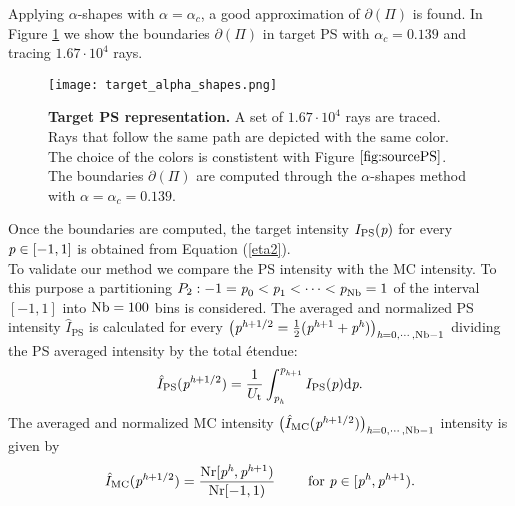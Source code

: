 Applying $\alpha$-shapes with $\alpha=\alpha_c$, a good approximation of $\partial$$(\Pi)$ is found. In Figure \ref{fig:targetPS} we show the boundaries 
$\partial$$(\Pi)$ in target PS  with $\alpha_c=0.139$ and tracing $1.67\cdot10^4$ rays.
  \begin{figure}[h]
  \begin{center}
  \texttt{[image: target\_alpha\_shapes.png]}
  \end{center}
  \caption{\textbf{Target PS representation.} A set of $1.67 \cdot 10^4$ rays are traced.
  Rays that follow the same path are depicted with the same color. The choice of the colors is constistent with Figure $\ref{fig:sourcePS}$. The boundaries $\partial$$(\Pi)$ are computed through the $\alpha$-shapes method with $\alpha = \alpha_c = 0.139$.}
  \label{fig:targetPS}
\end{figure}
Once the boundaries are computed, the target intensity $I_{\textrm{PS}}(\textit{p})$ for every $\textit{p}\in[-1,1]$ is obtained from Equation (\ref{eta2}). \\ \indent
To validate our method we compare the PS intensity with the MC intensity. 
To this purpose a partitioning $P_2:-1=\textit{p}_{0}<\textit{p}_1<\cdots<\textit{p}_{\textrm{Nb}}=1$ of the interval $[-1,1]$ into $\textrm{Nb}=100$ bins is considered. 
The averaged and normalized PS intensity $\hat{I}_{\textrm{PS}}$ is calculated for every 
$\big(\textit{p}^{\textit{h}+1/2} = \frac{1}{2}(\textit{p}^{\textit{h}+1}+ \textit{p}^{\textit{h}})\big)_{\textit{h}=0, \cdots, \textrm{Nb}-1}$ dividing the PS averaged intensity by the total \'{e}tendue:
\begin{equation}\label{eq:normalized_PS_intensity}
\hat{I}_{\textrm{PS}}(\textit{p}^{\textit{h}+1/2}) = \frac{1}{U_{\textrm{t}}}\int_{\textit{p}_{\textit{h}}}^{\textit{p}_{\textit{h}+1}} I_{\textrm{PS}}(\textit{p})\textrm{d}\textit{p}.
\end{equation}
The averaged and normalized MC intensity $\big(\hat{I}_{\textrm{MC}}(\textit{p}^{\textit{h}+1/2})\big)_{\textit{h} = 0, \cdots, \textrm{Nb}-1}$ intensity is given by
\begin{equation}\label{eq:normalized_MC_intensity}
\hat{I}_{\textrm{MC}}(\textit{p}^{\textit{h}+1/2}) = \frac{\textrm{Nr}[\textit{p}^{\textit{h}},\textit{p}^{\textit{h}+1})}{\textrm{Nr}[-1,1)} 
\qquad \mbox{ for } \textit{p}\in[\textit{p}^{\textit{h}}, \textit{p}^{\textit{h}+1}).
\end{equation} 
